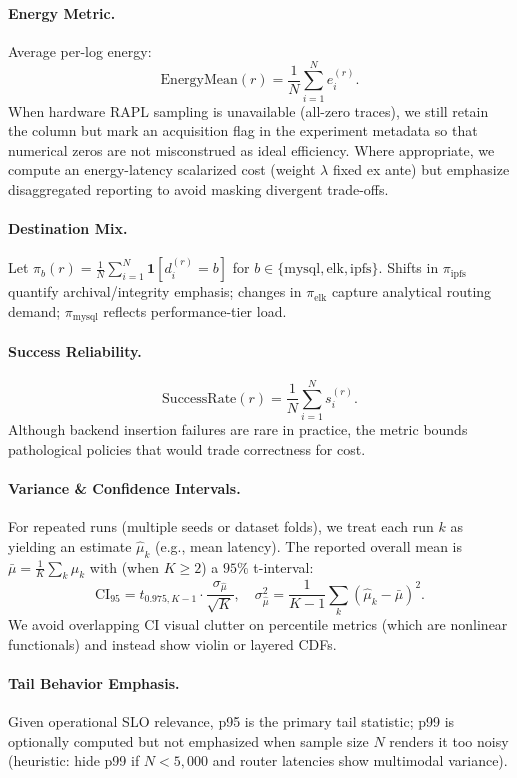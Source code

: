 \paragraph{Energy Metric.}
Average per-log energy:
\[
\text{EnergyMean}(r)=\frac{1}{N}\sum_{i=1}^N e_i^{(r)}.
\]
When hardware RAPL sampling is unavailable (all-zero traces), we still retain the column but mark an acquisition flag in the experiment metadata so that numerical zeros are not misconstrued as ideal efficiency. Where appropriate, we compute an energy-latency scalarized cost (weight $\lambda$ fixed ex ante) but emphasize disaggregated reporting to avoid masking divergent trade-offs.

\paragraph{Destination Mix.}
Let $\pi_b(r) = \frac{1}{N}\sum_{i=1}^N \mathbf{1}[d_i^{(r)}=b]$ for $b \in \{\text{mysql},\text{elk},\text{ipfs}\}$. Shifts in $\pi_{\text{ipfs}}$ quantify archival/integrity emphasis; changes in $\pi_{\text{elk}}$ capture analytical routing demand; $\pi_{\text{mysql}}$ reflects performance-tier load.

\paragraph{Success Reliability.}
\[
\text{SuccessRate}(r)=\frac{1}{N}\sum_{i=1}^N s_i^{(r)}.
\]
Although backend insertion failures are rare in practice, the metric bounds pathological policies that would trade correctness for cost.

\paragraph{Variance \& Confidence Intervals.}
For repeated runs (multiple seeds or dataset folds), we treat each run $k$ as yielding an estimate $\hat{\mu}_k$ (e.g., mean latency). The reported overall mean is $\bar{\mu} = \frac{1}{K}\sum_k \hat{\mu}_k$ with (when $K\ge 2$) a $95\%$ t-interval:
\[
\text{CI}_{95} = t_{0.975, K-1} \cdot \frac{\sigma_{\hat{\mu}}}{\sqrt{K}}, \quad 
\sigma_{\hat{\mu}}^2 = \frac{1}{K-1}\sum_k (\hat{\mu}_k - \bar{\mu})^2.
\]
We avoid overlapping CI visual clutter on percentile metrics (which are nonlinear functionals) and instead show violin or layered CDFs.

\paragraph{Tail Behavior Emphasis.}
Given operational SLO relevance, p95 is the primary tail statistic; p99 is optionally computed but not emphasized when sample size $N$ renders it too noisy (heuristic: hide p99 if $N < 5{,}000$ and router latencies show multimodal variance).

